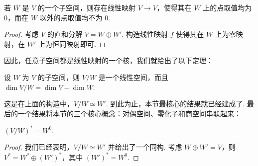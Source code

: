 \begin{lemma}{}{}
    若 $W$ 是 $V$ 的一个子空间，则存在线性映射 $V \to V$，使得其在 $W$ 上的点取值均为 $0$，而在 $W$ 以外的点取值均不为 $0$.
\end{lemma}

\begin{proof}
    考虑 $V$ 的直和分解 $V = W \oplus W'$. 构造线性映射 $f$ 使得其在 $W$ 上为零映射，在 $W'$ 上为恒同映射即可.
\end{proof}

因此，任意子空间都是线性映射的一个核，我们就给出了以下定理：

\begin{theorem}{}{}
    设 $W$ 为 $V$ 的子空间，则 $V/W$ 是一个线性空间，而且 $\dim V/W = \dim V - \dim W$.
\end{theorem}

这是在上面的构造中，$V/W \simeq W'$. 到此为止，本节最核心的结果就已经建成了. 最后的一个结果将本节的三个核心概念：对偶空间、零化子和商空间串联起来：

\begin{theorem}{}{}
    $(V/W)^* = W^0$.
\end{theorem}

\begin{proof}
    我们已经表明，$V/W \simeq W'$ 并给出了一个同构. 考虑 $W \oplus W' = V$，则 $V^* = W^* \oplus (W')^*$，其中 $(W')^* = W^0$.
\end{proof}





